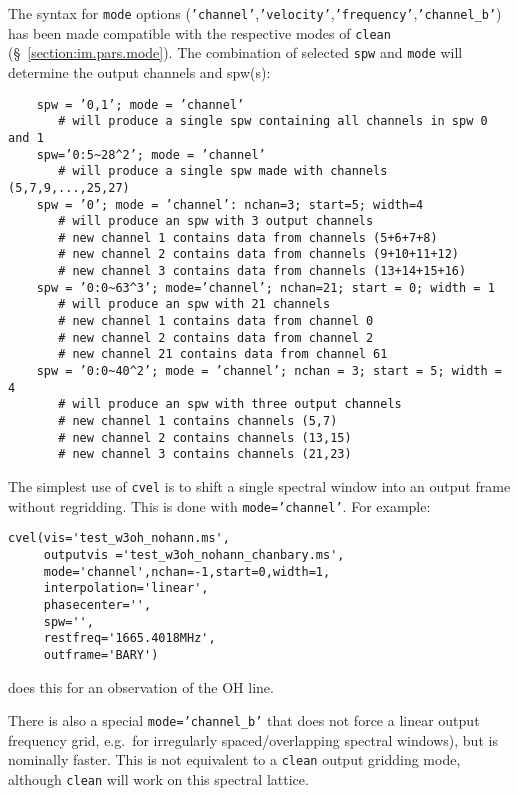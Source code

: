 The syntax for {\tt mode} options 
({\tt 'channel'},{\tt 'velocity'},{\tt 'frequency'},{\tt 'channel\_b'})
has been made compatible with the
respective modes of {\tt clean} (\S~\ref{section:im.pars.mode}).  The
combination of selected {\tt spw} and {\tt mode} will determine the
output channels and spw(s):
\small
\begin{verbatim}
    spw = ’0,1’; mode = ’channel’  
       # will produce a single spw containing all channels in spw 0 and 1  
    spw=’0:5~28^2’; mode = ’channel’  
       # will produce a single spw made with channels (5,7,9,...,25,27)  
    spw = ’0’; mode = ’channel’: nchan=3; start=5; width=4  
       # will produce an spw with 3 output channels  
       # new channel 1 contains data from channels (5+6+7+8)  
       # new channel 2 contains data from channels (9+10+11+12)  
       # new channel 3 contains data from channels (13+14+15+16)  
    spw = ’0:0~63^3’; mode=’channel’; nchan=21; start = 0; width = 1  
       # will produce an spw with 21 channels  
       # new channel 1 contains data from channel 0  
       # new channel 2 contains data from channel 2  
       # new channel 21 contains data from channel 61  
    spw = ’0:0~40^2’; mode = ’channel’; nchan = 3; start = 5; width = 4  
       # will produce an spw with three output channels  
       # new channel 1 contains channels (5,7)  
       # new channel 2 contains channels (13,15)  
       # new channel 3 contains channels (21,23) 
\end{verbatim}
\normalsize

The simplest use of {\tt cvel} is to shift a single spectral window
into an output frame without regridding.  This is done with 
{\tt mode='channel'}.  For example:
\small
\begin{verbatim}
cvel(vis='test_w3oh_nohann.ms',
     outputvis ='test_w3oh_nohann_chanbary.ms',
     mode='channel',nchan=-1,start=0,width=1,
     interpolation='linear',
     phasecenter='',
     spw='',
     restfreq='1665.4018MHz',
     outframe='BARY')
\end{verbatim}
\normalsize
does this for an observation of the OH line.

There is also a special {\tt mode='channel\_b'} that does not force a
linear output frequency grid, e.g.\ for irregularly spaced/overlapping
spectral windows), but is nominally faster.  This is not equivalent to
a {\tt clean} output gridding mode, although {\tt clean} will
work on this spectral lattice.

